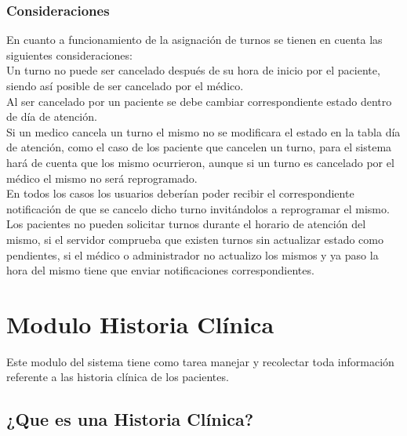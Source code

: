\subsubsection{Consideraciones}

En cuanto a funcionamiento de la asignación de turnos se tienen en cuenta las siguientes consideraciones: \\[0.1cm]

Un turno no puede ser cancelado después de su hora de inicio por el paciente, siendo así posible de ser cancelado por el médico. \\[0.1cm]

Al ser cancelado por un paciente se debe cambiar correspondiente estado dentro de día de atención. \\[0.1cm]

 Si un medico cancela un turno el mismo no se modificara el estado en la tabla  día de atención, como el caso de los paciente que cancelen un turno, para el sistema hará de cuenta que los mismo ocurrieron, aunque si un turno es cancelado por el médico el mismo no será reprogramado. \\[0.1cm]

 En todos los casos los usuarios deberían poder recibir el correspondiente notificación de que se cancelo dicho turno invitándolos a reprogramar el mismo. \\[0.1cm]

Los pacientes no pueden solicitar turnos durante el horario de atención del mismo, si el servidor comprueba que existen turnos sin actualizar estado como pendientes, si el médico o administrador no actualizo los mismos y ya paso la hora del mismo tiene que enviar notificaciones correspondientes. \\[0.1cm]



\section{Modulo Historia Clínica}

Este modulo del sistema tiene como tarea manejar y recolectar toda información referente a las historia clínica de los pacientes.


\subsection{¿Que es una Historia Clínica?}

